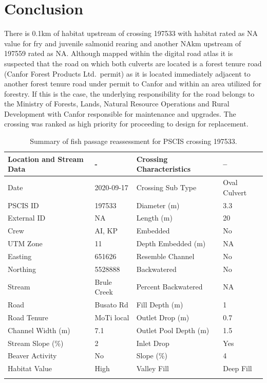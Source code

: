 \documentclass[
]{book}
\begin{document}
\hypertarget{conclusion-7}{%
\section*{Conclusion}\label{conclusion-7}}

There is 0.1km of habitat upstream of crossing 197533 with habitat rated as NA value for fry and juvenile salmonid rearing and another NAkm upstream of 197559 rated as NA. Although mapped within the digital road atlas it is suspected that the road on which both culverts are located is a forest tenure road (Canfor Forest Products Ltd.~permit) as it is located immediately adjacent to another forest tenure road under permit to Canfor and within an area utilized for forestry. If this is the case, the underlying responsibility for the road belongs to the Ministry of Forests, Lands, Natural Resource Operations and Rural Development with Canfor responsible for maintenance and upgrades. The crossing was ranked as high priority for proceeding to design for replacement.

\begin{table}

\caption{\label{tab:tab-culvert-197533}Summary of fish passage reassessment for PSCIS crossing 197533.}
\centering
\fontsize{11}{13}\selectfont
\begin{tabu} to 
\toprule
Location and Stream Data & - & Crossing Characteristics & --\\
\midrule
Date & 2020-09-17 & Crossing Sub Type & Oval Culvert\\
PSCIS ID & 197533 & Diameter (m) & 3.3\\
External ID & NA & Length (m) & 20\\
Crew & AI, KP & Embedded & No\\
UTM Zone & 11 & Depth Embedded (m) & NA\\
\addlinespace
Easting & 651626 & Resemble Channel & No\\
Northing & 5528888 & Backwatered & No\\
Stream & Brule Creek & Percent Backwatered & NA\\
Road & Busato Rd & Fill Depth (m) & 1\\
Road Tenure & MoTi local & Outlet Drop (m) & 0.7\\
\addlinespace
Channel Width (m) & 7.1 & Outlet Pool Depth (m) & 1.5\\
Stream Slope (\%) & 2 & Inlet Drop & Yes\\
Beaver Activity & No & Slope (\%) & 4\\
Habitat Value & High & Valley Fill & Deep Fill\\
\bottomrule
{}\\
\end{tabu}
\end{table}
\end{document}

